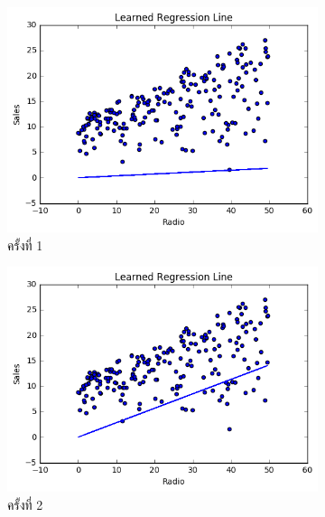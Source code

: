 \begin{figure}[H]
    \centering
    \begin{subfigure}{0.5\textwidth}
        \centering
        \includegraphics[width=\linewidth]{fig/plot_simple_reg_1.png}
        \caption{ครั้งที่ 1}
        \label{fig:plot_simple_reg_1}
    \end{subfigure}%
    \begin{subfigure}{0.5\textwidth}
        \centering
        \includegraphics[width=\linewidth]{fig/plot_simple_reg_2.png}
        \caption{ครั้งที่ 2}
        \label{fig:plot_simple_reg_2}
    \end{subfigure}
    \\
    \begin{subfigure}{0.5\textwidth}
        \centering

\end{subfigure}
\end{figure}
